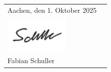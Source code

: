 \documentclass{article}
\theoremstyle{mystyle}
\begin{document}
\noindent

\thispagestyle{empty}

\begin{tabularx}{\textwidth}{@{}lX@{}}
Aachen, den 1. Oktober 2025 
& 
\begin{flushright}

  \rule{6cm}{0.4pt} \\[-1.5cm] %
  \includegraphics[height=1.8cm]{images/unterschrift.png} \\
  Fabian Schuller
\end{flushright}

\end{tabularx}

\newpage

\tableofcontents
\newpage
















\end{document}
